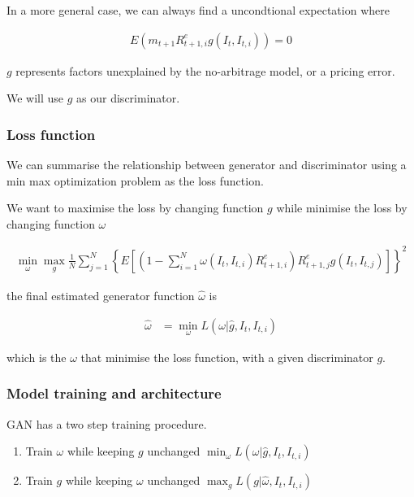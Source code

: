 \documentclass[11pt, oneside]{article}   	%
\begin{document}
In a more general case, we can always find a uncondtional expectation where 

\begin{align*}
    E(m_{t+1}R^e_{t+1, i}g(I_t, I_{t, i}))=0
\end{align*}

$g$ represents factors unexplained by the no-arbitrage model, or a pricing error.

We will use $g$ as our discriminator.

\subsubsection{Loss function}

We can summarise the relationship between generator and discriminator using a 
min max optimization problem as the loss function.

We want to maximise the loss by changing function $g$ while minimise the loss by changing function $\omega$

\begin{align*}
    \min_{\omega} \max_{g} \frac{1}{N} \sum_{j=1}^N \left\{
    E \left[ 
        \left( 1 - \sum_{i=1}^N \omega(I_t, I_{t, i}) R^e_{t+1, i} \right)
        R^e_{t+1, j}g(I_t, I_{t, j})
    \right] \right\}^2
\end{align*}

the final estimated generator function $\hat\omega$ is

\begin{align*}
    \hat\omega &= \min_{\omega} L(\omega|\hat{g}, I_t, I_{t, i})
\end{align*}

which is the $\omega$ that minimise the loss function, with a given discriminator $g$.

\subsubsection{Model training and architecture}

GAN has a two step training procedure.

\begin{enumerate}
    \item Train $\omega$ while keeping $g$ unchanged
        \subitem $\min_{\omega} L(\omega|\hat{g}, I_t, I_{t,i})$
    \item Train $g$ while keeping $\omega$ unchanged
        \subitem $\max_{g} L(g|\hat\omega, I_t, I_{t,i})$
\end{enumerate}
\end{document}
